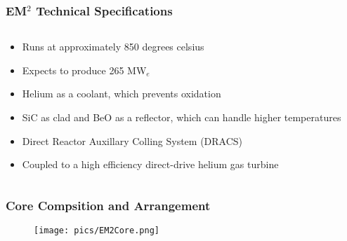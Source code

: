 \begin{frame}
\frametitle{EM$^{2}$ Technical Specifications}
\begin{columns}[t]
\begin{column}{.6\textwidth}
\begin{itemize}
\item Runs at approximately 850 degrees celsius 
\item Expects to produce 265 MW$_{e}$
\item Helium as a coolant, which prevents oxidation
\item SiC as clad and BeO as a reflector, which can handle higher temperatures
\item Direct Reactor Auxillary Colling System (DRACS)
\item Coupled to a high efficiency direct-drive helium gas turbine 
\end{itemize}
\end{column}
\begin{column}{.4\textwidth}
\end{column}
\end{columns}
\end{frame}


\begin{frame}
\frametitle{Core Compsition and Arrangement}
\begin{figure}
\texttt{[image: pics/EM2Core.png]}
\end{figure}

\end{frame}


